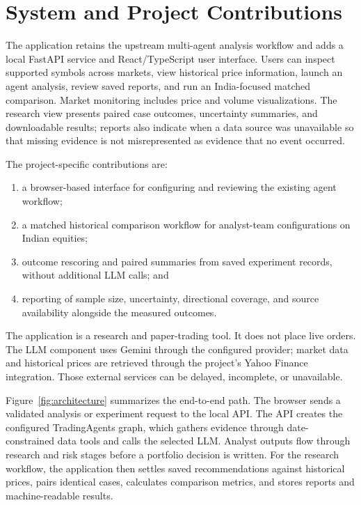 \documentclass[10pt]{article}
\begin{document}
\section{System and Project Contributions}
The application retains the upstream multi-agent analysis workflow and adds a local FastAPI service and React/TypeScript user interface. Users can inspect supported symbols across markets, view historical price information, launch an agent analysis, review saved reports, and run an India-focused matched comparison. Market monitoring includes price and volume visualizations. The research view presents paired case outcomes, uncertainty summaries, and downloadable results; reports also indicate when a data source was unavailable so that missing evidence is not misrepresented as evidence that no event occurred.

The project-specific contributions are:
\begin{enumerate}
  \item a browser-based interface for configuring and reviewing the existing agent workflow;
  \item a matched historical comparison workflow for analyst-team configurations on Indian equities;
  \item outcome rescoring and paired summaries from saved experiment records, without additional LLM calls; and
  \item reporting of sample size, uncertainty, directional coverage, and source availability alongside the measured outcomes.
\end{enumerate}
The application is a research and paper-trading tool. It does not place live orders. The LLM component uses Gemini through the configured provider; market data and historical prices are retrieved through the project's Yahoo Finance integration. Those external services can be delayed, incomplete, or unavailable.

Figure~\ref{fig:architecture} summarizes the end-to-end path. The browser sends a validated analysis or experiment request to the local API. The API creates the configured TradingAgents graph, which gathers evidence through date-constrained data tools and calls the selected LLM. Analyst outputs flow through research and risk stages before a portfolio decision is written. For the research workflow, the application then settles saved recommendations against historical prices, pairs identical cases, calculates comparison metrics, and stores reports and machine-readable results.
\end{document}
